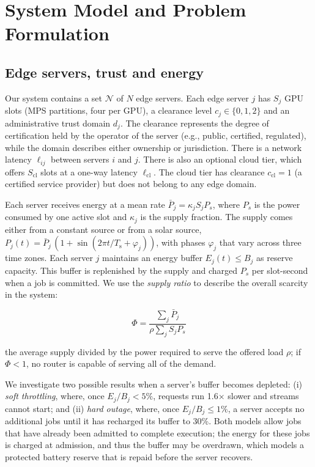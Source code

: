 \documentclass[journal]{IEEEtran}
\begin{document}
\section{System Model and Problem Formulation}

\subsection{Edge servers, trust and energy}

Our system contains a set \(\mathcal{N}\) of \(N\) edge servers. Each edge server \(j\) has \(S_j\) GPU slots (MPS partitions, four per GPU), a clearance level \(c_j\in\{0,1,2\}\) and an administrative trust domain \(d_j\). The clearance represents the degree of certification held by the operator of the server (e.g., public, certified, regulated), while the domain describes either ownership or jurisdiction. There is a network latency \(\ell_{ij}\) between servers \(i\) and \(j\). There is also an optional cloud tier, which offers \(S_\mathrm{cl}\) slots at a one-way latency \(\ell_\mathrm{cl}\). The cloud tier has clearance \(c_\mathrm{cl}=1\) (a certified service provider) but does not belong to any edge domain.

Each server receives energy at a mean rate \(\bar P_j=\kappa_j S_j P_s\), where \(P_s\) is the power consumed by one active slot and \(\kappa_j\) is the supply fraction. The supply comes either from a constant source or from a solar source, \(P_j(t)=\bar P_j\,(1+\sin(2\pi t/T_\mathrm{s}+\varphi_j))\), with phases \(\varphi_j\) that vary across three time zones. Each server \(j\) maintains an energy buffer \(E_j(t)\le B_j\) as reserve capacity. This buffer is replenished by the supply and charged \(P_s\) per slot-second when a job is committed. We use the \emph{supply ratio} to describe the overall scarcity in the system:

\begin{equation}
\Phi=\frac{\sum_j \bar P_j}{\rho\sum_j S_j P_s}
\end{equation}

the average supply divided by the power required to serve the offered load \(\rho\); if \(\Phi<1\), no router is capable of serving all of the demand.

We investigate two possible results when a server's buffer becomes depleted: (i) \emph{soft throttling}, where, once \(E_j/B_j<5\%\), requests run 1.6\(\times\) slower and streams cannot start; and (ii) \emph{hard outage}, where, once \(E_j/B_j\le 1\%\), a server accepts no additional jobs until it has recharged its buffer to 30\%. Both models allow jobs that have already been admitted to complete execution; the energy for these jobs is charged at admission, and thus the buffer may be overdrawn, which models a protected battery reserve that is repaid before the server recovers.
\end{document}
